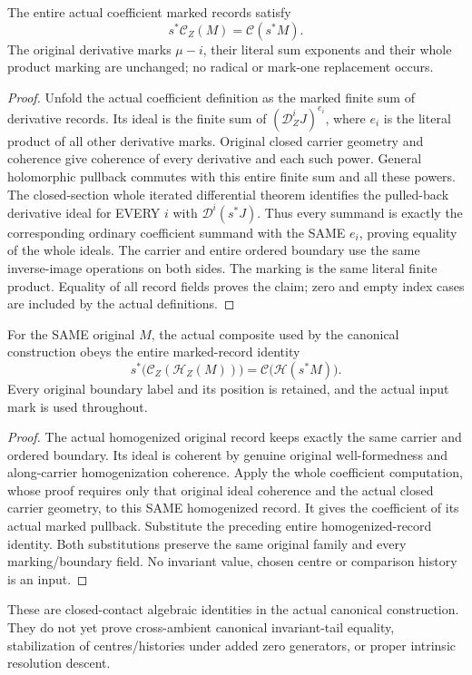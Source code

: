 \begin{theorem}
\label{hir:actual-zero-section-whole-coefficient-marked}
\leanok
The entire actual coefficient marked records satisfy
\[
 s^*\mathcal C_Z(M)=\mathcal C(s^*M).
\]
The original derivative marks $\mu-i$, their literal sum exponents and their whole product marking are unchanged; no radical or mark-one replacement occurs.
\end{theorem}
\begin{proof}
Unfold the actual coefficient definition as the marked finite sum of derivative records. Its ideal is the finite sum of $(\mathcal D_Z^iJ)^{e_i}$, where $e_i$ is the literal product of all other derivative marks. Original closed carrier geometry and coherence give coherence of every derivative and each such power. General holomorphic pullback commutes with this entire finite sum and all these powers. The closed-section whole iterated differential theorem identifies the pulled-back derivative ideal for EVERY $i$ with $\mathcal D^i(s^*J)$. Thus every summand is exactly the corresponding ordinary coefficient summand with the SAME $e_i$, proving equality of the whole ideals. The carrier and entire ordered boundary use the same inverse-image operations on both sides. The marking is the same literal finite product. Equality of all record fields proves the claim; zero and empty index cases are included by the actual definitions.
\end{proof}

\begin{theorem}
\label{hir:actual-zero-section-whole-coefficient-homogenized-seed}
\leanok
For the SAME original $M$, the actual composite used by the canonical construction obeys the entire marked-record identity
\[
 s^*\bigl(\mathcal C_Z(\mathcal H_Z(M))\bigr)
       =\mathcal C\bigl(\mathcal H(s^*M)\bigr).
\]
Every original boundary label and its position is retained, and the actual input mark is used throughout.
\end{theorem}
\begin{proof}
The actual homogenized original record keeps exactly the same carrier and ordered boundary. Its ideal is coherent by genuine original well-formedness and along-carrier homogenization coherence. Apply the whole coefficient computation, whose proof requires only that original ideal coherence and the actual closed carrier geometry, to this SAME homogenized record. It gives the coefficient of its actual marked pullback. Substitute the preceding entire homogenized-record identity. Both substitutions preserve the same original family and every marking/boundary field. No invariant value, chosen centre or comparison history is an input.
\end{proof}

These are closed-contact algebraic identities in the actual canonical construction. They do not yet prove cross-ambient canonical invariant-tail equality, stabilization of centres/histories under added zero generators, or proper intrinsic resolution descent.
